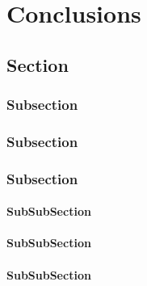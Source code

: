 \chapter{Conclusions}

\section{Section}
\subsection{Subsection}

\subsection{Subsection}

\subsection{Subsection}

\subsubsection{SubSubSection}

\subsubsection{SubSubSection}

\subsubsection{SubSubSection}

